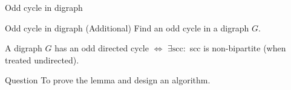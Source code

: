 \begin{frame}{Odd cycle in digraph}
  \begin{exampleblock}{Odd cycle in digraph (Additional)}
    Find an odd cycle in a digraph $G$.
  \end{exampleblock}

  \pause
  \begin{lemma}
    A digraph $G$ has an odd directed cycle $\iff$ $\exists \text{scc}: $ scc is non-bipartite (when treated undirected).
  \end{lemma}

  \pause
  \begin{alertblock}{Question}
	To prove the lemma and design an algorithm.
  \end{alertblock}
\end{frame}
